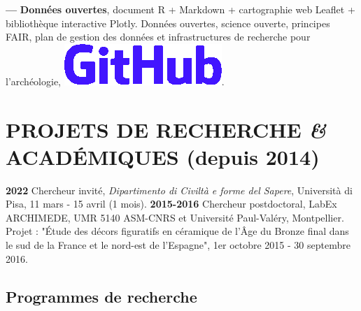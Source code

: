 \documentclass{article}
\begin{document}
\smallbreak
\textbf{--- }\textbf{Données ouvertes}, document \textsf{R} + \textsf{Markdown} + cartographie web \textsf{Leaflet} + bibliothèque interactive \textsf{Plotly}. Données ouvertes, science ouverte, principes FAIR, plan de gestion des données et infrastructures de recherche pour l'archéologie, \href{https://zoometh.github.io/LOD}{\includegraphics[scale=0.1]{github-rect.png}}.

\section{PROJETS DE RECHERCHE \textit{\&} ACADÉMIQUES (depuis 2014)}

\textbf{2022} Chercheur invité, \textit{Dipartimento di Civiltà e forme del Sapere}, Università di Pisa, 11 mars - 15 avril (1 mois).
\smallbreak
\textbf{2015-2016} Chercheur postdoctoral, LabEx ARCHIMEDE, UMR 5140 ASM-CNRS et Université Paul-Valéry, Montpellier. Projet : "Étude des décors figuratifs en céramique de l'Âge du Bronze final dans le sud de la France et le nord-est de l'Espagne", 1er octobre 2015 - 30 septembre 2016.
\smallbreak

\subsection*{Programmes de recherche}
\end{document}
